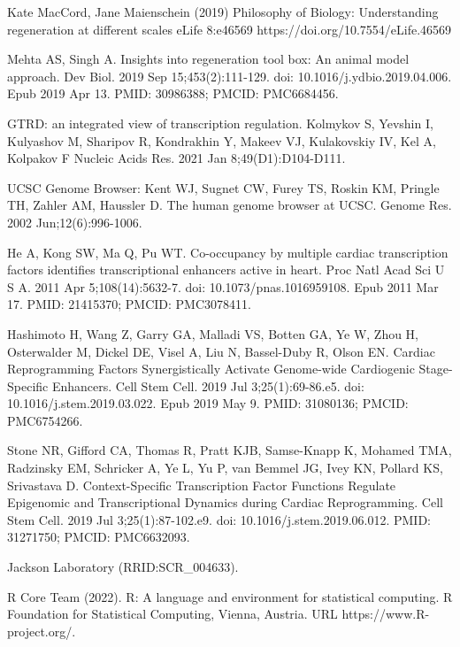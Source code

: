\documentclass[12pt]{article}
\begin{document}

\begin{thebibliography}{99}

 Kate MacCord, Jane Maienschein (2019) Philosophy of
Biology: Understanding regeneration at different scales eLife 8:e46569
https://doi.org/10.7554/eLife.46569

 Mehta AS, Singh A. Insights into regeneration tool box:
An animal model approach. Dev Biol. 2019 Sep 15;453(2):111-129.
doi: 10.1016/j.ydbio.2019.04.006. Epub 2019 Apr 13. PMID: 30986388;
PMCID: PMC6684456.

 GTRD: an integrated view of transcription regulation.
Kolmykov S, Yevshin I, Kulyashov M, Sharipov R, Kondrakhin Y, Makeev VJ,
Kulakovskiy IV, Kel A, Kolpakov F Nucleic Acids Res. 2021 Jan
8;49(D1):D104-D111.

 UCSC Genome Browser: Kent WJ, Sugnet CW, Furey TS, Roskin KM,
Pringle TH, Zahler AM, Haussler D. The human genome browser at UCSC. Genome Res.
2002 Jun;12(6):996-1006.

 He A, Kong SW, Ma Q, Pu WT. Co-occupancy by multiple cardiac
transcription factors identifies transcriptional enhancers active in heart.
Proc Natl Acad Sci U S A. 2011 Apr 5;108(14):5632-7.
doi: 10.1073/pnas.1016959108. Epub 2011 Mar 17. PMID: 21415370;
PMCID: PMC3078411.

 Hashimoto H, Wang Z, Garry GA, Malladi VS, Botten GA, Ye W,
Zhou H, Osterwalder M, Dickel DE, Visel A, Liu N, Bassel-Duby R, Olson EN.
Cardiac Reprogramming Factors Synergistically Activate Genome-wide Cardiogenic
Stage-Specific Enhancers. Cell Stem Cell. 2019 Jul 3;25(1):69-86.e5.
doi: 10.1016/j.stem.2019.03.022. Epub 2019 May 9. PMID: 31080136;
PMCID: PMC6754266.

 Stone NR, Gifford CA, Thomas R, Pratt KJB, Samse-Knapp K,
Mohamed TMA, Radzinsky EM, Schricker A, Ye L, Yu P, van Bemmel JG, Ivey KN,
Pollard KS, Srivastava D. Context-Specific Transcription Factor Functions
Regulate Epigenomic and Transcriptional Dynamics during Cardiac Reprogramming.
Cell Stem Cell. 2019 Jul 3;25(1):87-102.e9. doi: 10.1016/j.stem.2019.06.012.
PMID: 31271750; PMCID: PMC6632093.

 Jackson Laboratory (RRID:SCR\_004633).

 R Core Team (2022).
R: A language and environment for statistical computing. R Foundation
for Statistical Computing, Vienna, Austria. URL https://www.R-project.org/.


\end{thebibliography}
\end{document}
